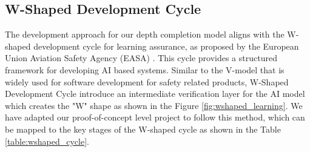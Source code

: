 \subsection{W-Shaped Development Cycle}
The development approach for our depth completion model aligns with the W-shaped development cycle for learning assurance, as proposed by the European Union Aviation Safety Agency (EASA) \cite{easa2024}. This cycle provides a structured framework for developing \ac{AI} based systems.
Similar to the V-model \cite{vmodel} that is widely used for software development for safety related products, W-Shaped Development Cycle introduce an intermediate verification layer for the \ac{AI} model which creates the "W" shape as shown in the Figure \ref{fig:wshaped_learning}.
We have adapted our proof-of-concept level project to follow this method, which can be mapped to the key stages of the W-shaped cycle as shown in the Table \ref{table:wshaped_cycle}.

